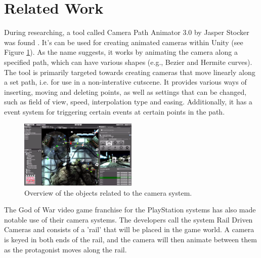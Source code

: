 \section{Related Work}

During researching, a tool called Camera Path Animator 3.0 by Jasper Stocker was found \cite{unity_camTool}. It's can be used for creating animated cameras within Unity (see Figure \ref{fig:unity_path_cam_tool}). As the name suggests, it works by animating the camera along a specified path, which can have various shapes (e.g., Bezier and Hermite curves). The tool is primarily targeted towards creating cameras that move linearly along a set path, i.e. for use in a non-interative cutscene. It provides various ways of inserting, moving and deleting points, as well as settings that can be changed, such as field of view, speed, interpolation type and easing. Additionally, it has a event system for triggering certain events at certain points in the path.

\begin{figure}[htbp]
\centering
\includegraphics[width=0.50\textwidth]{Pics/unity_path_cam_tool}
\caption{Overview of the objects related to the camera system.}
\label{fig:unity_path_cam_tool}
\end{figure}

The God of War video game franchise for the PlayStation systems has also made notable use of their camera systems. The developers call the system Rail Driven Cameras and consists of a 'rail' that will be placed in the game world. A camera is keyed in both ends of the rail, and the camera will then animate between them as the protagonist moves along the rail. %